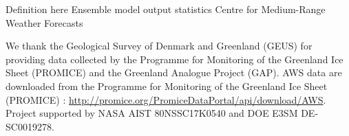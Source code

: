 \documentclass[draft]{agujournal2019}
\begin{document}
%
%

%
  \begin{acronyms}
  Definition here
  Ensemble model output statistics
  Centre for Medium-Range Weather Forecasts
  \end{acronyms}

%




%
%
%
%
%
%
%
%


\acknowledgments
We thank the Geological Survey of Denmark and Greenland (GEUS) 
for providing data collected 
by the Programme for Monitoring of the Greenland Ice Sheet (PROMICE) 
and the Greenland Analogue Project (GAP). 
AWS data are downloaded from 
the Programme for Monitoring of the Greenland Ice Sheet (PROMICE) \cite{Fausto2019}: \url{http://promice.org/PromiceDataPortal/api/download/AWS}.
Project supported by NASA AIST 80NSSC17K0540 and DOE E3SM DE-SC0019278.
\end{document}
